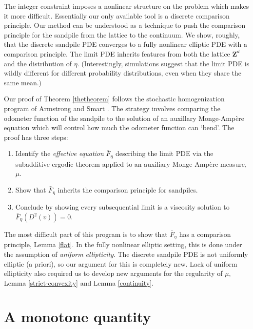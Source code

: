 \documentclass[12pt]{amsart}
\newcommand{\Z}{\mathbf{Z}}
\begin{document}
The integer constraint imposes a nonlinear structure on the problem which makes it more difficult. 
Essentially our only available tool is a discrete comparison principle. Our method can be understood 
as a technique to push the comparison principle for the sandpile from the lattice to the continuum. We show, roughly,
that the discrete sandpile PDE converges to a fully nonlinear elliptic PDE with a comparison principle.
The limit PDE inherits features from both the lattice $\Z^d$ and the distribution of $\eta$. (Interestingly, simulations 
suggest that the limit PDE is wildly different for different probability distributions, even when they share the same mean.)


Our proof of Theorem \ref{thetheorem} follows the stochastic homogenization program of Armstrong and Smart \cite{armstrong2014quantitative}. The strategy involves comparing the odometer function of the sandpile to the solution of an auxillary Monge-Amp{\`e}re equation \cite{gutierrez2016monge,trudinger2008monge} which will control how much the odometer function can `bend'. The proof has three steps: 
\begin{enumerate}
	\item Identify the {\it effective equation} $\bar{F}_{\eta}$ describing the limit PDE via the subadditive ergodic theorem applied to an auxiliary Monge-Amp{\`e}re measure, $\mu$.
	\item Show that $\bar{F}_{\eta}$ inherits the comparison principle for sandpiles.
	\item Conclude by showing every subsequential limit is a viscosity solution to $\bar{F}_{\eta}(D^2(v)) = 0$.
\end{enumerate}

The most difficult part of this program is to show that $\bar{F}_{\eta}$ has a comparison principle, Lemma \ref{flat}. In the fully nonlinear elliptic setting, this is done under the assumption of {\it uniform ellipticity}. The discrete sandpile PDE is not uniformly elliptic (a priori), so our argument for this is completely new. Lack of uniform ellipticity also required us to develop new arguments for the regularity of $\mu$, Lemma \ref{strict-convexity} and Lemma \ref{continuity}. 
 

\section{A monotone quantity} \label{sec:monotone_quantity}
\end{document}
